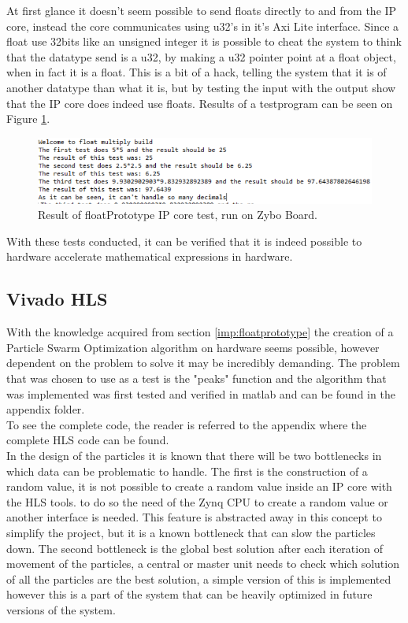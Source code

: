 At first glance it doesn't seem possible to send floats directly to and from the IP core, instead the core communicates using u32's in it's Axi Lite interface. Since a float use 32bits like an unsigned integer it is possible to cheat the system to think that the datatype send is a u32, by making a u32 pointer point at a float object, when in fact it is a float. This is a bit of a hack, telling the system that it is of another datatype than what it is, but by testing the input with the output show that the IP core does indeed use floats. Results of a testprogram can be seen on Figure \ref{fig:floatmultiply}.\\

\begin{figure}[H]
	\centering
	\includegraphics[trim={0 2 0 0},clip,width=0.8\linewidth]{diagram/floatMultiply}
	\caption{Result of floatPrototype IP core test, run on Zybo Board.}
	\label{fig:floatmultiply}
\end{figure}


With these tests conducted, it can be verified that it is indeed possible to hardware accelerate mathematical expressions in hardware.

\subsection{Vivado HLS}
With the knowledge acquired from section \ref{imp:floatprototype}  the creation of a Particle Swarm Optimization algorithm on hardware seems possible, however dependent on the problem to solve it may be incredibly demanding. The problem that was chosen to use as a test is the "peaks" function and the algorithm that was implemented was first tested and verified in matlab and can be found in the appendix folder.\\ %

To see the complete code, the reader is referred to the appendix where the complete HLS code can be found.\\ %

In the design of the particles it is known that there will be two bottlenecks in which data can be problematic to handle. The first is the construction of a random value, it is not possible to create a random value inside an IP core with the HLS tools. to do so the need of the Zynq CPU to create a random value or another interface is needed. This feature is abstracted away in this concept to simplify the project, but it is a known bottleneck that can slow the particles down. The second bottleneck is the global best solution after each iteration of movement of the particles, a central or master unit needs to check which solution of all the particles are the best solution, a simple version of this is implemented however this is a part of the system that can be heavily optimized in future versions of the system.\\

